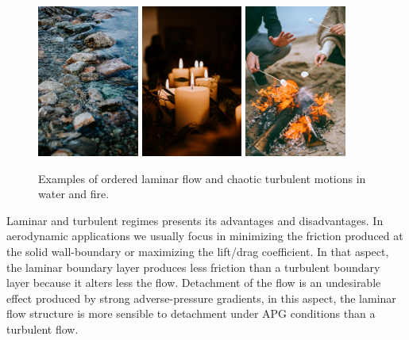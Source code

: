 \begin{figure}[h!]
\centering
\includegraphics[height=5cm ]{laminar_turbulent_1.jpg}
\includegraphics[height=5cm ]{velas.jpg}
\includegraphics[height=5cm ]{llama_turb1.jpg}
\caption{ \label{fig:lam_turb} Examples of ordered laminar flow and chaotic turbulent motions in water and fire.
   }
\end{figure}

Laminar and turbulent regimes presents its advantages and disadvantages. 
In aerodynamic applications we usually focus in minimizing the friction produced at the solid wall-boundary or maximizing the lift/drag coefficient. In that aspect, the laminar boundary layer produces less friction than a turbulent boundary layer because it alters less the flow.
Detachment of the flow is an undesirable effect produced by strong adverse-pressure gradients, in this aspect, the laminar flow structure is more sensible to detachment under APG conditions than a turbulent flow.

